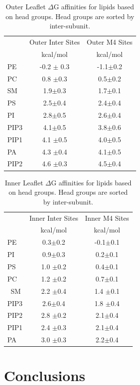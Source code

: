 \begin{table}
	\caption{Outer Leaflet $\Delta$G affinities for lipids based on head groups. Head groups are sorted by inter-subunit.}
    \centering
    \begin{tabular}{|l||c|c|}
    \hline
	{} &  Outer Inter Sites&  Outer M4 Sites\\
	{} & kcal/mol & kcal/mol\\
	\hline
	PE	&-0.2 $\pm$ 0.3& -1.1$\pm$0.2\\
	PC	& 0.8 $\pm$0.3 &  0.5$\pm$0.2\\
	SM	&1.9$\pm$0.3 &  1.7$\pm$0.1\\
	PS	&2.5$\pm$0.4 &  2.4$\pm$0.4\\
	PI	&2.8$\pm$0.5 &  2.6$\pm$0.4\\
	PIP3 &4.1$\pm$0.5 &  3.8$\pm$0.6 \\
	PIP1 &4.1 $\pm$0.5&  4.0$\pm$0.5\\
	PA &4.3 $\pm$0.4&  4.1$\pm$0.5\\
	PIP2 &4.6 $\pm$0.3&  4.5$\pm$0.4\\
	\hline
    \end{tabular}
    \label{tab:dGOuterHG}
\end{table}

\begin{table}
	\caption{Inner Leaflet $\Delta$G affinities for lipids based on head groups. Head groups are sorted by inter-subunit.}
    \centering
    \begin{tabular}{|l||c|c|}
    \hline
	{} &  Inner Inter Sites&  Inner M4 Sites\\
	{} & kcal/mol & kcal/mol\\
	\hline
	PE& 0.3$\pm$0.2& -0.1$\pm$0.1\\
	PI&0.9$\pm$0.3 &  0.2$\pm$0.1\\
	PS&1.0 $\pm$0.2	&  0.4$\pm$0.1\\
	PC&1.2 $\pm$0.2	&  0.7$\pm$0.1\\\
	SM&2.2 $\pm$0.4	&  1.4 $\pm$0.1\\
	PIP3	&2.6$\pm$0.4	 &  1.8 $\pm$0.4\\
	PIP2	&2.8 $\pm$0.2	&  2.1$\pm$0.4\\
	PIP1	&2.4 $\pm$0.3	&  2.1$\pm$0.4\\
	PA	&3.0 $\pm$0.3	&  2.2$\pm$0.4\\
	\hline
    \end{tabular}
    \label{tab:dGInnerHG}
\end{table}

\section{Conclusions}

